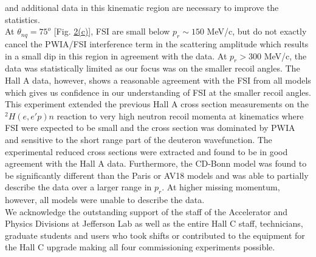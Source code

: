 and additional data in this kinematic region are necessary to improve the statistics. \\
\indent At $\theta_{nq}=75^{o}$ [Fig. \hyperref[fig:fig2]{2(c)}], FSI are small below $p_{r}\sim150$ MeV/c, but do not exactly cancel the PWIA/FSI interference term in the scattering amplitude which results in a small dip in this region in agreement with the data.
At $p_{r}>300$ MeV/c, the data was statistically limited as our focus was on the smaller recoil angles. The Hall A data, however, shows a reasonable agreement with the FSI from all models which gives us confidence in our understanding
of FSI at the smaller recoil angles. \\
\indent This experiment extended the previous Hall A cross section measurements on the $^{2}H(e,e'p)n$ reaction to 
very high neutron recoil momenta at kinematics where FSI were expected to be small and the cross section was dominated by PWIA and sensitive to the
short range part of the deuteron wavefunction. The experimental reduced cross sections were extracted and found to be in good agreement with the Hall A data.
Furthermore, the CD-Bonn model was found to be significantly different than the Paris or AV18 models and was able to partially describe the data over a larger range in $p_{r}$.
At higher missing momentum, however, all models were unable to describe the data. \\
\indent We acknowledge the outstanding support of the staff of the Accelerator and Physics Divisions at Jefferson Lab
as well as the entire Hall C staff, technicians, graduate students and users who took shifts or contributed
to the equipment for the Hall C upgrade making all four commissioning experiments possible. 

